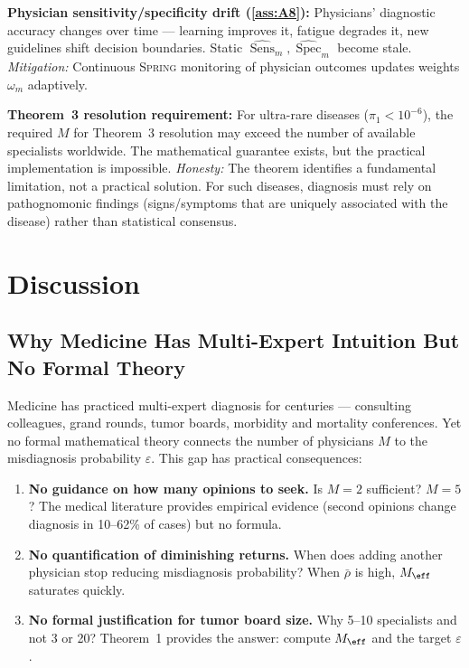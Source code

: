 \documentclass[11pt,a4paper]{article}
\theoremstyle{definition}
\newcommand{\Spring}{\textsc{Spring}}
\DeclareMathOperator{\Sens}{Sens}
\DeclareMathOperator{\Spec}{Spec}
\newcommand{\limitationTag}[1]{\textsf{\textbf{[L#1]}}}
\begin{document}
\begin{enumerate}[label=\limitationTag{\arabic*}, nosep]
    \item \textbf{Physician sensitivity/specificity drift (\ref{ass:A8}):}
    Physicians' diagnostic accuracy changes over time --- learning improves
    it, fatigue degrades it, new guidelines shift decision boundaries.
    Static $\hat{\Sens}_m, \hat{\Spec}_m$ become stale. \textit{Mitigation:}
    Continuous \Spring{} monitoring of physician outcomes updates weights
    $\omega_m$ adaptively.

    \item \textbf{Theorem~3 resolution requirement:} For ultra-rare diseases
    ($\pi_1 < 10^{-6}$), the required $M$ for Theorem~3 resolution may
    exceed the number of available specialists worldwide. The mathematical
    guarantee exists, but the practical implementation is impossible.
    \textit{Honesty:} The theorem identifies a fundamental limitation, not
    a practical solution. For such diseases, diagnosis must rely on
    pathognomonic findings (signs/symptoms that are uniquely associated
    with the disease) rather than statistical consensus.

\end{enumerate}

\section{Discussion}
\label{sec:discussion}

\subsection{Why Medicine Has Multi-Expert Intuition But No Formal Theory}

Medicine has practiced multi-expert diagnosis for centuries --- consulting
colleagues, grand rounds, tumor boards, morbidity and mortality conferences.
Yet no formal mathematical theory connects the number of physicians $M$ to
the misdiagnosis probability $\varepsilon$. This gap has practical consequences:

\begin{enumerate}[nosep]
    \item \textbf{No guidance on how many opinions to seek.} Is $M=2$ sufficient?
    $M=5$? The medical literature provides empirical evidence (second opinions
    change diagnosis in 10--62\% of cases) but no formula.
    \item \textbf{No quantification of diminishing returns.} When does adding
    another physician stop reducing misdiagnosis probability? When $\bar{\rho}$
    is high, $M_{\eff}$ saturates quickly.
    \item \textbf{No formal justification for tumor board size.} Why 5--10
    specialists and not 3 or 20? Theorem~1 provides the answer: compute
    $M_{\eff}$ and the target $\varepsilon$.
\end{enumerate}
\end{document}
